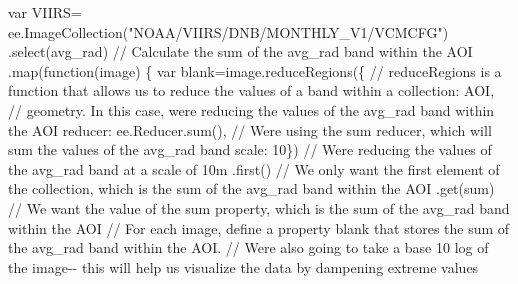 \documentclass[
  letterpaper,
  DIV=11,
  numbers=noendperiod]{scrreprt}
\newenvironment{Shaded}{\begin{snugshade}}{\end{snugshade}}
\newcommand{\AttributeTok}[1]{\textcolor[rgb]{0.40,0.45,0.13}{#1}}
\newcommand{\CommentTok}[1]{\textcolor[rgb]{0.37,0.37,0.37}{#1}}
\newcommand{\DataTypeTok}[1]{\textcolor[rgb]{0.68,0.00,0.00}{#1}}
\newcommand{\DecValTok}[1]{\textcolor[rgb]{0.68,0.00,0.00}{#1}}
\newcommand{\FunctionTok}[1]{\textcolor[rgb]{0.28,0.35,0.67}{#1}}
\newcommand{\KeywordTok}[1]{\textcolor[rgb]{0.00,0.23,0.31}{#1}}
\newcommand{\NormalTok}[1]{\textcolor[rgb]{0.00,0.23,0.31}{#1}}
\newcommand{\OperatorTok}[1]{\textcolor[rgb]{0.37,0.37,0.37}{#1}}
\newcommand{\StringTok}[1]{\textcolor[rgb]{0.13,0.47,0.30}{#1}}
\begin{document}
\begin{Shaded}
\begin{Highlighting}[]
\KeywordTok{var}\NormalTok{ VIIRS}\OperatorTok{=}\NormalTok{ ee}\OperatorTok{.}\FunctionTok{ImageCollection}\NormalTok{(}\StringTok{"NOAA/VIIRS/DNB/MONTHLY\_V1/VCMCFG"}\NormalTok{) }
                    \OperatorTok{.}\FunctionTok{select}\NormalTok{(}\StringTok{\textquotesingle{}avg\_rad\textquotesingle{}}\NormalTok{)}
                    \CommentTok{// Calculate the sum of the \textquotesingle{}avg\_rad\textquotesingle{} band within the AOI}
                    \OperatorTok{.}\FunctionTok{map}\NormalTok{(}\KeywordTok{function}\NormalTok{(image) \{ }
                    \KeywordTok{var}\NormalTok{ blank}\OperatorTok{=}\NormalTok{image}\OperatorTok{.}\FunctionTok{reduceRegions}\NormalTok{(\{ }\CommentTok{// reduceRegions is a function that allows us to reduce the values of a band within a}
                                    \DataTypeTok{collection}\OperatorTok{:}\NormalTok{ AOI}\OperatorTok{,} \CommentTok{// geometry. In this case, we\textquotesingle{}re reducing the values of the \textquotesingle{}avg\_rad\textquotesingle{} band within the AOI}
                                    \DataTypeTok{reducer}\OperatorTok{:}\NormalTok{ ee}\OperatorTok{.}\AttributeTok{Reducer}\OperatorTok{.}\FunctionTok{sum}\NormalTok{()}\OperatorTok{,} \CommentTok{// We\textquotesingle{}re using the sum reducer, which will sum the values of the \textquotesingle{}avg\_rad\textquotesingle{} band}
                                    \DataTypeTok{scale}\OperatorTok{:} \DecValTok{10}\NormalTok{\}) }\CommentTok{// We\textquotesingle{}re reducing the values of the \textquotesingle{}avg\_rad\textquotesingle{} band at a scale of 10m}
                                \OperatorTok{.}\FunctionTok{first}\NormalTok{() }\CommentTok{// We only want the first element of the collection, which is the sum of the \textquotesingle{}avg\_rad\textquotesingle{} band within the AOI}
                                \OperatorTok{.}\FunctionTok{get}\NormalTok{(}\StringTok{\textquotesingle{}sum\textquotesingle{}}\NormalTok{) }\CommentTok{// We want the value of the \textquotesingle{}sum\textquotesingle{} property, which is the sum of the \textquotesingle{}avg\_rad\textquotesingle{} band within the AOI}
                    \CommentTok{// For each image, define a property \textquotesingle{}blank\textquotesingle{} that stores the sum of the \textquotesingle{}avg\_rad\textquotesingle{} band within the AOI. }
                    \CommentTok{// We\textquotesingle{}re also going to take a base 10 log of the image{-}{-} this will help us visualize the data by dampening extreme values             }

\end{Highlighting}
\end{Shaded}
\end{document}
